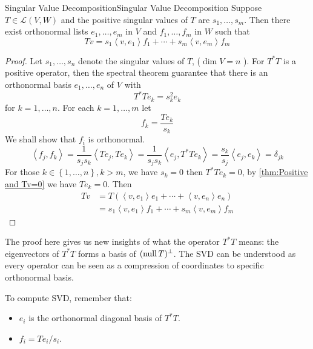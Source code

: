 \documentclass[../main.tex]{subfiles}
\begin{document}
\begin{theorem}{Singular Value Decomposition}{Singular Value Decomposition}
Suppose $T\in \mathscr{L}(V,W)$ and the positive singular values of $T$ are $s_1, \ldots ,s_m$. Then there exist orthonormal lists $e_1, \ldots ,e_m$ in $V$ and $f_1, \ldots ,f_m$ in $W$ such that
\begin{equation*}
Tv = s_1 \left<v,e_1\right> f_1 + \cdots + s_m \left<v,e_m\right> f_m
\end{equation*}
\end{theorem}
\begin{proof}
Let $s_1, \ldots ,s_n$ denote the singular values of $T$, ($\dim V=n$ ). For $T^*T$ is a positive operator, then the spectral theorem guarantee that there is an orthonormal basis $e_1, \ldots ,e_n$ of $V$ with
\begin{equation*}
T^*Te_k = s_k^2 e_k
\end{equation*}
for $k=1, \ldots ,n$. For each $k=1, \ldots ,m$ let
\begin{equation*}
f_k = \frac{Te_k}{s_k}
\end{equation*}
We shall show that $f_i$ is orthonormal.
\begin{equation*}
\left<f_j,f_k\right> = \frac{1}{s_js_k} \left<Te_j,Te_k\right> = \frac{1}{s_js_k} \left<e_j, T^*Te_k\right> = \frac{s_k}{s_j} \left<e_j,e_k\right> = \delta_{jk}
\end{equation*}
For those $k\in \left\{ 1, \ldots ,n \right\}, k>m$, we have $s_k=0$ then $T^*Te_k=0$, by \ref{thm:Positive and Tv=0} we have $Te_k=0$. Then
\begin{equation*}
\begin{aligned}
	Tv &= T \left(\left<v,e_1\right>e_1 + \cdots + \left<v,e_n\right>e_n \right)\\
	   &= s_1 \left<v,e_1\right>f_1 +\cdots +s_m \left<v,e_m\right>f_m
\end{aligned}
\end{equation*}
\end{proof}

\begin{remark}
The proof here gives us new insights of what the operator $T^*T$ means: the eigenvectors of $T^*T$ forms a basis of $(\operatorname{null} T)^{\perp}$. The SVD can be understood as every operator can be seen as a compression of coordinates to specific orthonormal basis.

To compute SVD, remember that:
\begin{itemize}
\item $e_i$ is the orthonormal diagonal basis of $T^*T$.
\item $f_i = Te_i / s_i$.
\end{itemize}
\end{remark}
\end{document}

